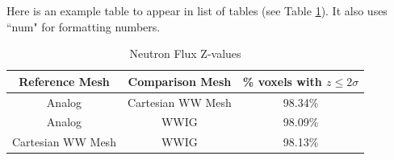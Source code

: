 Here is an example table to appear in list of tables (see Table \ref{tab:toy:zvalue}). It also uses ``num" for formatting numbers.

\begin{table}[h]
\centering
\caption{Neutron Flux Z-values} \label{tab:toy:zvalue}
	\begin{tabular}{| c | c | c |}
	\hline
	\textbf{Reference Mesh} & \textbf{Comparison Mesh} & \% \textbf{voxels with $z \leq 2\sigma$} \\
	\hline
	Analog & Cartesian WW Mesh & \num{98.34}\% \\
	\hline
	Analog & WWIG & \num{98.09}\% \\
	\hline
	Cartesian WW Mesh & WWIG & \num{98.13}\% \\
	\hline
	\end{tabular}
\end{table}